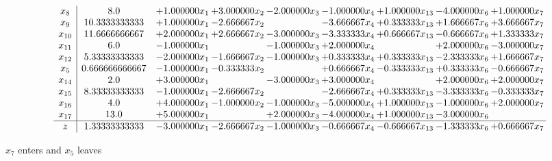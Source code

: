 \documentclass[10pt]{article}
\begin{document}
 \[\begin{array}{c| c c@{\hskip 2pt} c@{\hskip 2pt} c@{\hskip 2pt} c@{\hskip 2pt} c@{\hskip 2pt} c@{\hskip 2pt} c@{\hskip 2pt} }
 x_{8}   &  8.0 & + 1.000000 x_{1} & + 3.000000 x_{2} & -2.000000 x_{3} & -1.000000 x_{4} & + 1.000000 x_{13} & -4.000000 x_{6} & + 1.000000 x_{7}\\
 x_{9}   &  10.3333333333 & + 1.000000 x_{1} & -2.666667 x_{2} &   & -3.666667 x_{4} & + 0.333333 x_{13} & + 1.666667 x_{6} & + 3.666667 x_{7}\\
 x_{10}   &  11.6666666667 & + 2.000000 x_{1} & + 2.666667 x_{2} & -3.000000 x_{3} & -3.333333 x_{4} & + 0.666667 x_{13} & -0.666667 x_{6} & + 1.333333 x_{7}\\
 x_{11}   &  6.0 & -1.000000 x_{1} &   & -1.000000 x_{3} & + 2.000000 x_{4} &   & + 2.000000 x_{6} & -3.000000 x_{7}\\
 x_{12}   &  5.33333333333 & -2.000000 x_{1} & -1.666667 x_{2} & -1.000000 x_{3} & + 0.333333 x_{4} & + 0.333333 x_{13} & -2.333333 x_{6} & + 1.666667 x_{7}\\
 x_{5}   &  0.666666666667 & -1.000000 x_{1} & -0.333333 x_{2} &   & + 0.666667 x_{4} & -0.333333 x_{13} & + 0.333333 x_{6} & -0.666667 x_{7}\\
 x_{14}   &  2.0 & + 3.000000 x_{1} &   & -3.000000 x_{3} & + 3.000000 x_{4} &   & + 2.000000 x_{6} & + 2.000000 x_{7}\\
 x_{15}   &  8.33333333333 & -1.000000 x_{1} & -2.666667 x_{2} &   & -2.666667 x_{4} & + 0.333333 x_{13} & -3.333333 x_{6} & -0.333333 x_{7}\\
 x_{16}   &  4.0 & + 4.000000 x_{1} & -1.000000 x_{2} & -1.000000 x_{3} & -5.000000 x_{4} & + 1.000000 x_{13} & -1.000000 x_{6} & + 2.000000 x_{7}\\
 x_{17}   &  13.0 & + 5.000000 x_{1} &   & + 2.000000 x_{3} & -4.000000 x_{4} & + 1.000000 x_{13} & -3.000000 x_{6} &   \\
\hline
z    &  1.33333333333 & -3.000000 x_{1} & -2.666667 x_{2} & -1.000000 x_{3} & -0.666667 x_{4} & -0.666667 x_{13} & -1.333333 x_{6} & + 0.666667 x_{7}\\
\end{array}\]


 $ x_{7} $ enters and $ x_{5} $ leaves 
\end{document}
